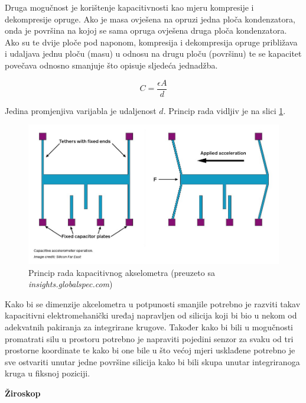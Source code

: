 \documentclass[times, utf8, diplomski]{fer}
\begin{document}
Druga mogučnost je korištenje kapacitivnosti kao mjeru kompresije i dekompresije opruge. Ako je masa ovješena na opruzi jedna ploča
kondenzatora, onda je površina na kojoj se sama opruga ovješena druga ploča kondenzatora. Ako su te dvije ploče pod naponom,
kompresija i dekompresija opruge približava i udaljava jednu ploču (masu) u odnosu na drugu ploču (površinu) te se kapacitet
povečava odnosno smanjuje što opisuje sljedeća jednadžba.

$$
C = \frac{\epsilon A}{d}
$$

Jedina promjenjiva varijabla je udaljenost $d$. Princip rada vidljiv je na slici \ref{accmtr}.


\begin{figure}[h!]
    \includegraphics[width=\textwidth]{Accelerometers.jpg}
    \caption{Princip rada kapacitivnog akselometra (preuzeto sa \textit{insights.globalspec.com})}
    \label{accmtr}
\end{figure}

Kako bi se dimenzije akcelometra u potpunosti smanjile potrebno je razviti takav kapacitivni elektromehanički uređaj napravljen od
silicija koji bi bio u nekom od adekvatnih pakiranja za integrirane krugove. Također kako bi bili u mogučnosti promatrati silu u
prostoru potrebno je napraviti pojedini senzor za svaku od tri prostorne koordinate te kako bi one bile u što većoj mjeri usklađene
potrebno je sve ostvariti unutar jedne površine silicija kako bi bili skupa unutar integriranoga kruga u fiksnoj poziciji.

\textbf{Žiroskop}
\end{document}
